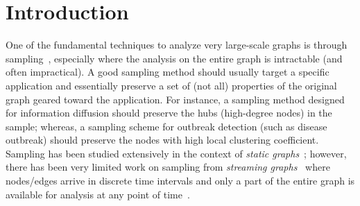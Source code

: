 
\section{Introduction}


One of the fundamental techniques to analyze very large-scale graphs is through sampling~\cite{leskovec2006sampling}, especially where the analysis on the entire graph is intractable (and often impractical).
A good sampling method should usually target a specific application and essentially preserve a set of (not all) properties of the original graph geared toward the application. For instance, a sampling method
designed for information diffusion should preserve the hubs (high-degree nodes) in the sample; whereas, a sampling scheme for outbreak detection (such as disease outbreak) should preserve the nodes with high local clustering coefficient.
Sampling has been studied extensively in the context of {\em static graphs}~\cite{leskovec2006sampling,gjoka2010walking,maiya2010sampling,rasti2009respondent,ribeiro2010estimating}; 
however, there has been very limited work on sampling from {\em streaming graphs}~\cite{henzinger1998computing} where nodes/edges arrive in discrete time intervals and only a part of the entire graph is available for analysis at any point of time~\cite{aggarwal2011outlier,ahmed2014network,lim2015mascot,de2016tri}. 


